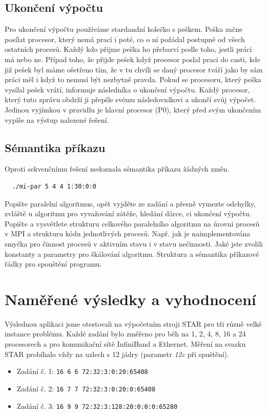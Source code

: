 \documentclass[12pt]{article}
\begin{document}
\subsection{Ukončení výpočtu}
Pro ukončení výpočtu používáme stardandní kolečko s peškem. Peška začne posílat
procesor, který nemá prací i poté, co o ní požádal postupně od všech ostatních
procesů. Každý kdo přijme peška ho přebarví podle toho, jestli práci má nebo ne.
Případ toho, že přijde pešek když procesor poslal praci do casti, kde již pešek
byl máme ošetřeno tím, že v tu chvíli se daný procesor tváří jako by sám práci
měl i když to nemusí být nezbytně pravda. Pokud se procesoru, který peška
vysílal pešek vrátí, informuje následníka o ukončení výpočtu. Každý procesor,
který tuto zprávu obdrží ji přepšle svému následovníkovi a ukončí svůj výpočet.
Jedinou vyjímkou v pravidlu je hlavní procesor (P0), který před svým ukončením
vypíše na výstup nalezené řešení.

\subsection{Sémantika příkazu}
Oproti sekvenčnímu řešení nedoznala sémantika příkazu žádných změn. 
\begin{verbatim}
  ./mi-par 5 4 4 1:30:0:0                 
\end{verbatim} 

Popište paralelní algoritmus, opět vyjděte ze zadání a přesně
vymezte odchylky, zvláště u algoritmu pro vyvažování zátěže, hledání
dárce, ci ukončení výpočtu.  Popište a vysvětlete strukturu
celkového paralelního algoritmu na úrovni procesů v MPI a strukturu
kódu jednotlivých procesů. Např. jak je naimplementována smyčka pro
činnost procesů v aktivním stavu i v stavu nečinnosti. Jaké jste
zvolili konstanty a parametry pro škálování algoritmu. Struktura a
sémantika příkazové řádky pro spouštění programu.

\section{Naměřené výsledky a vyhodnocení}

Výslednou aplikaci jsme otestovali na výpočetním stroji STAR pro tři různě velké instance problému. Každé zadání bylo změřeno pro běh na 1, 2, 4, 8, 16 a 24 procesorech a pro komunikační sítě InfiniBand a Ethernet. Měření na svazku STAR probíhalo vždy na uzlech s 12 jádry (parametr \textit{12c} při spuštění).

\begin{itemize}
\item Zadání č. 1: \texttt{16 6 6 72:32:3:0:20:65408}
\item Zadání č. 2: \texttt{16 7 7 72:32:3:0:20:0:65408}
\item Zadání č. 3: \texttt{16 9 9 72:32:3:128:20:0:0:0:65280}



\end{itemize}
\end{document}
